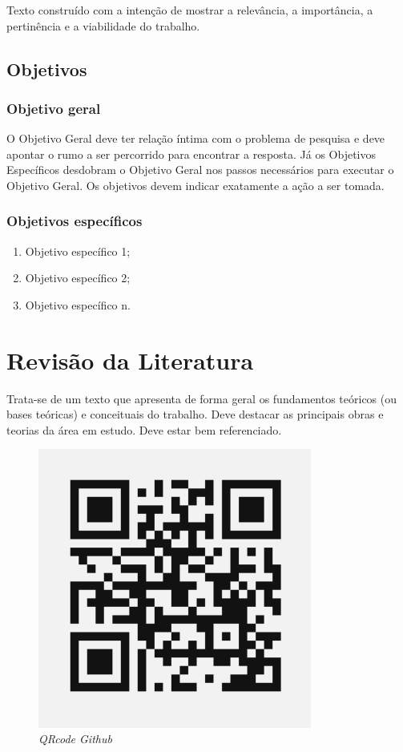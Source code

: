 \documentclass{unemat-tex}
\begin{document}
		Texto construído com a intenção de mostrar	a relevância, a importância, a pertinência e a viabilidade do trabalho.
	
	\section{Objetivos}
	
		\subsection{Objetivo geral}
		
			O Objetivo Geral deve ter relação íntima com o problema de	pesquisa e deve apontar o rumo a ser percorrido para encontrar a resposta. Já os	Objetivos Específicos desdobram o Objetivo Geral nos passos necessários para executar o	Objetivo Geral. Os objetivos devem indicar	exatamente a ação a ser tomada.
		
		\subsection{Objetivos específicos}
		
			\begin{enumerate}
				\item Objetivo específico 1;
				\item Objetivo específico 2;
				\item Objetivo específico n.
			\end{enumerate}

\chapter{Revisão da Literatura}
	
	Trata-se de um texto que apresenta de forma	geral os fundamentos teóricos (ou bases	teóricas) e conceituais do trabalho. Deve destacar as principais obras e teorias da área em estudo. Deve estar bem referenciado.
	
	
	\begin{figure}[h]{
		\caption{\label{Debian}\textit{QRcode Github}}
		\centering
		\includegraphics[width=9cm]{Imagens/Karan_GitHub.png}
		}
	\end{figure}
	
\end{document}

